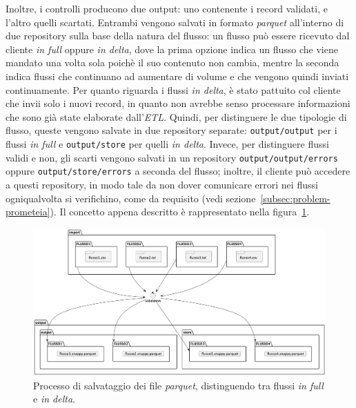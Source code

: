 Inoltre, i controlli producono due output: uno contenente i record validati, e l'altro quelli scartati.
Entrambi vengono salvati in formato \textit{parquet} all'interno di due repository sulla base della natura del flusso:
un flusso può essere ricevuto dal cliente \textit{in full} oppure \textit{in delta}, dove la prima opzione indica un flusso che viene mandato una volta sola poichè il suo contenuto non cambia, mentre la seconda indica flussi che continuano ad aumentare di volume e che vengono quindi inviati continuamente.
Per quanto riguarda i flussi \textit{in delta}, è stato pattuito col cliente che invii solo i nuovi record, in quanto non avrebbe senso processare informazioni che sono già state elaborate dall'\textit{ETL}.
Quindi, per distinguere le due tipologie di flusso, queste vengono salvate in due repository separate: \texttt{output/output} per i flussi \textit{in full} e \texttt{output/store} per quelli \textit{in delta}.
Invece, per distinguere flussi validi e non, gli scarti vengono salvati in un repository \texttt{output/output/errors} oppure \texttt{output/store/errors} a seconda del flusso;
inoltre, il cliente può accedere a questi repository, in modo tale da non dover comunicare errori nei flussi ogniqualvolta si verifichino, come da requisito (vedi sezione~\ref{subsec:problem-prometeia}).
Il concetto appena descritto è rappresentato nella figura~\ref{fig:full-delta}.
\begin{figure}
          \includegraphics[width=\textwidth]{img/full-delta.png}
          \centering
          \caption{Processo di salvataggio dei file \textit{parquet}, distinguendo tra flussi \textit{in full} e \textit{in delta}.}
          \label{fig:full-delta}
\end{figure}

